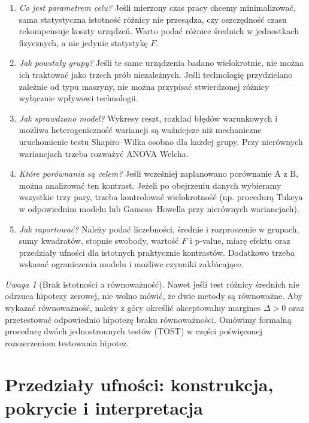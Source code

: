 \documentclass[11pt,a4paper,oneside]{report}
\numberwithin{equation}{chapter}
\theoremstyle{plain}
\theoremstyle{definition}
\theoremstyle{remark}
\newtheorem{uwaga}{Uwaga}[chapter]
\begin{document}
\begin{enumerate}
\item \emph{Co jest parametrem celu?} Jeśli mierzony czas
pracy chcemy minimalizować, sama statystyczna istotność
różnicy nie przesądza, czy oszczędność czasu rekompensuje
koszty urządzeń. Warto podać różnice średnich w jednostkach
fizycznych, a nie jedynie statystykę $F$.
\item \emph{Jak powstały grupy?} Jeśli te same urządzenia
badano wielokrotnie, nie można ich traktować jako trzech
prób niezależnych. Jeśli technologię przydzielano zależnie
od typu maszyny, nie można przypisać stwierdzonej różnicy
wyłącznie wpływowi technologii.
\item \emph{Jak sprawdzono model?} Wykresy reszt, rozkład
błędów warunkowych i możliwa heterogeniczność wariancji
są ważniejsze niż mechaniczne uruchomienie testu
Shapiro--Wilka osobno dla każdej grupy. Przy nierównych
wariancjach trzeba rozważyć ANOVA Welcha.
\item \emph{Które porównania są celem?} Jeśli wcześniej
zaplanowano porównanie A z B, można analizować ten kontrast.
Jeżeli po obejrzeniu danych wybieramy wszystkie trzy pary,
trzeba kontrolować wielokrotność (np. procedurą Tukeya
w odpowiednim modelu lub Gamesa--Howella przy nierównych
wariancjach).
\item \emph{Jak raportować?} Należy podać liczebności,
średnie i rozproszenie w grupach, sumy kwadratów, stopnie
swobody, wartość $F$ i p-value, miarę efektu oraz
przedziały ufności dla istotnych praktycznie kontrastów.
Dodatkowo trzeba wskazać ograniczenia modelu i możliwe
czynniki zakłócające.
\end{enumerate}

\begin{uwaga}[Brak istotności a równoważność]
Nawet jeśli test różnicy średnich nie odrzuca hipotezy
zerowej, nie wolno mówić, że dwie metody są równoważne.
Aby wykazać równoważność, należy z góry określić
akceptowalny margines $\Delta>0$ oraz przetestować
odpowiednio hipotezę braku równoważności. Omówimy
formalną procedurę dwóch jednostronnych testów (TOST)
w części poświęconej rozszerzeniom testowania hipotez.
\end{uwaga}



\chapter{Przedziały ufności: konstrukcja, pokrycie i interpretacja}
\label{ch:confidence-intervals}
\end{document}
